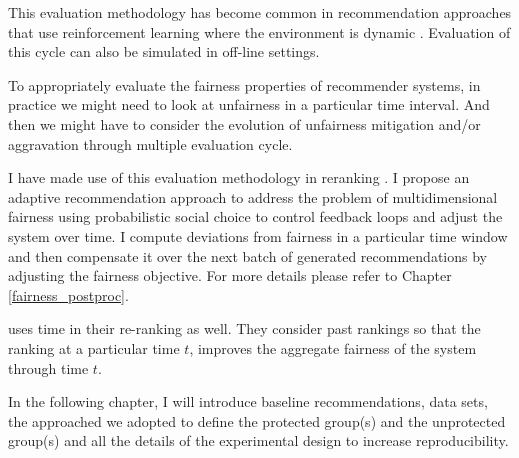     This evaluation methodology has become common in recommendation approaches that use reinforcement learning where the environment is dynamic \cite{Lihong2010bandit,Zheng2018DRN}. Evaluation of this cycle can also be simulated in off-line settings.  
    
    To appropriately evaluate the fairness properties of recommender systems, in practice we might need to look at unfairness in a particular time interval. And then we might have to consider the evolution of unfairness mitigation and/or aggravation through multiple evaluation cycle.
    
    I have made use of this evaluation methodology in reranking \cite{sonboli2020dynm}. I propose an adaptive recommendation approach to address the problem of multidimensional fairness using probabilistic social choice to control feedback loops and adjust the system over time. I compute deviations from fairness in a particular time window and then compensate it over the next batch of generated recommendations by adjusting the fairness objective. For more details please refer to Chapter \ref{fairness_postproc}.

    \cite{biega2018equity} uses time in their re-ranking as well. They consider past rankings so that the ranking at a particular time $t$, improves the aggregate fairness of the system through time $t$.
    
    
    In the following chapter, I will introduce baseline recommendations, data sets, the approached we adopted to define the protected group(s) and the unprotected group(s) and all the details of the experimental design to increase reproducibility.
